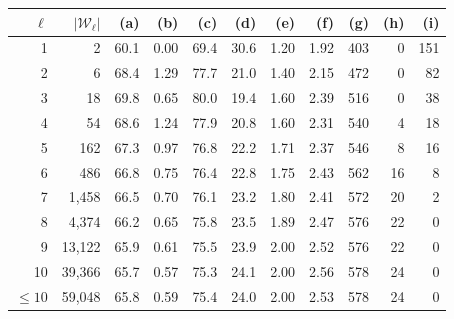 \documentclass[11pt]{article}
\theoremstyle{definition}
\theoremstyle{remark}
\newcommand{\Sol}{\mathcal{S}}
\newcommand{\Orc}{\mathcal{O}}
\newcommand{\W}{\mathcal{W}}
\begin{document}
\begin{center}
\begin{tabular}{rrrrrrrrrrr}
\toprule
$\ell$ & $|\W_\ell|$ & (a) & (b) & (c) & (d) & (e) & (f) & (g) & (h) & (i)\\
\midrule
1 & 2 & 60.1 & 0.00 & 69.4 & 30.6 & 1.20 & 1.92 & 403 & 0 & 151\\
2 & 6 & 68.4 & 1.29 & 77.7 & 21.0 & 1.40 & 2.15 & 472 & 0 & 82\\
3 & 18 & 69.8 & 0.65 & 80.0 & 19.4 & 1.60 & 2.39 & 516 & 0 & 38\\
4 & 54 & 68.6 & 1.24 & 77.9 & 20.8 & 1.60 & 2.31 & 540 & 4 & 18\\
5 & 162 & 67.3 & 0.97 & 76.8 & 22.2 & 1.71 & 2.37 & 546 & 8 & 16\\
6 & 486 & 66.8 & 0.75 & 76.4 & 22.8 & 1.75 & 2.43 & 562 & 16 & 8\\
7 & 1{,}458 & 66.5 & 0.70 & 76.1 & 23.2 & 1.80 & 2.41 & 572 & 20 & 2\\
8 & 4{,}374 & 66.2 & 0.65 & 75.8 & 23.5 & 1.89 & 2.47 & 576 & 22 & 0\\
9 & 13{,}122 & 65.9 & 0.61 & 75.5 & 23.9 & 2.00 & 2.52 & 576 & 22 & 0\\
10 & 39{,}366 & 65.7 & 0.57 & 75.3 & 24.1 & 2.00 & 2.56 & 578 & 24 & 0\\
\midrule
$\le10$ & 59{,}048 & 65.8 & 0.59 & 75.4 & 24.0 & 2.00 & 2.53 & 578 & 24 & 0\\
\bottomrule
\end{tabular}
\end{center}

\begin{center}
\end{center}
\end{document}
